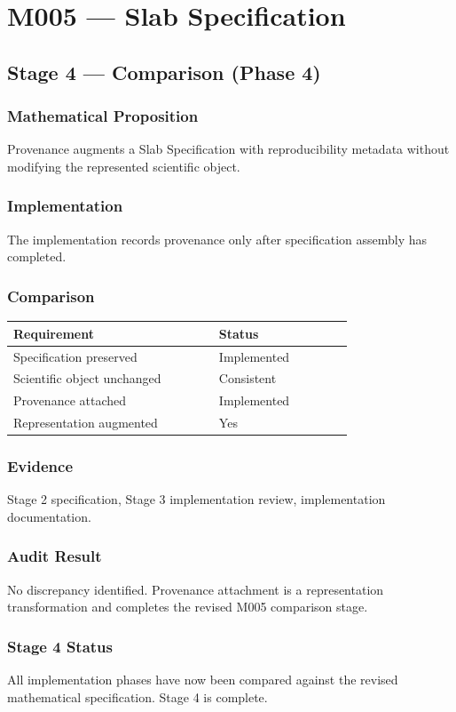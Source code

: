 \chapter{M005 --- Slab Specification}

\section{Stage 4 --- Comparison (Phase 4)}

\subsection{Mathematical Proposition}

Provenance augments a Slab Specification with reproducibility metadata
without modifying the represented scientific object.

\subsection{Implementation}

The implementation records provenance only after specification assembly
has completed.

\subsection{Comparison}

\begin{center}
\begin{tabular}{|p{0.46\linewidth}|p{0.30\linewidth}|}
\hline
Requirement & Status\\
\hline
Specification preserved & Implemented\\
Scientific object unchanged & Consistent\\
Provenance attached & Implemented\\
Representation augmented & Yes\\
\hline
\end{tabular}
\end{center}

\subsection{Evidence}

Stage 2 specification, Stage 3 implementation review, implementation
documentation.

\subsection{Audit Result}

No discrepancy identified. Provenance attachment is a representation
transformation and completes the revised M005 comparison stage.

\subsection{Stage 4 Status}

All implementation phases have now been compared against the revised
mathematical specification. Stage 4 is complete.
